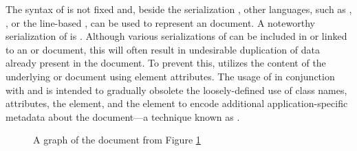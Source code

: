 \documentclass[
  a5paper,10pt,           %
  dvipsnames              %
]{book}
\begin{document}
The syntax of  is not fixed and, beside the 
serialization \cite{lassira99}, other languages, such as ,
 \cite{beckett14:turtle}, or the line-based 
\cite{beckett14:nt}, can be used to represent an  document. A
noteworthy serialization of  is .  Although various
serializations of  can be included in or linked to an
 or  document, this will often result in
undesirable duplication of data already present in the document. To prevent
this,  utilizes the content of the underlying  or
 document using element attributes. The usage of 
in conjunction with  and  is intended to gradually
obsolete the loosely-defined use of  class names, attributes, the
 element, and the  element to encode additional
application-specific metadata about the document---a technique known as
.

\begin{figure}
  \label{fig:rdf-doc}
\end{figure}

\begin{figure}
\end{figure}

\begin{figure}
  
  \caption{A graph of the  document from Figure
    \ref{fig:rdf-doc}}
\end{figure}

        
\end{document}
